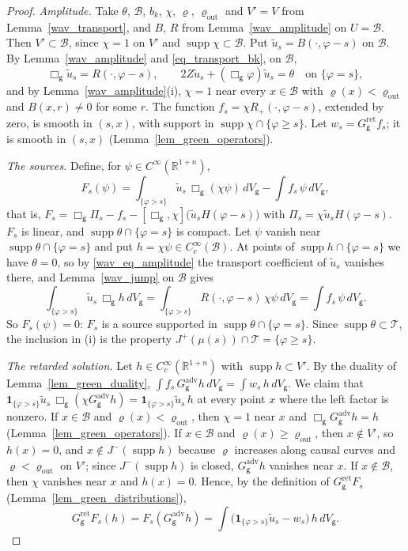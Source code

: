 \documentclass[11pt,a4paper,reqno]{amsart}
\theoremstyle{definition}
\numberwithin{equation}{section}
\newcommand{\R}{\mathbb{R}}
\newcommand{\cB}{\mathcal{B}}
\newcommand{\cT}{\mathcal{T}}
\newcommand{\sg}{\mathsf{g}}
\newcommand{\supp}{\operatorname{supp}}
\newcommand{\ret}{\mathrm{ret}}
\newcommand{\adv}{\mathrm{adv}}
\begin{document}
\begin{proof}
\emph{Amplitude.} Take $\theta$, $\cB$, $b_k$, $\chi$, $\varrho$, $\varrho_{\mathrm{out}}$ and $V'=V$ from
Lemma~\ref{wav_transport}, and $B$, $R$ from Lemma~\ref{wav_amplitude} on $U=\cB$. Then $V'\subset\cB$, since $\chi=1$ on
$V'$ and $\supp\chi\subset\cB$. Put $\tilde u_s=B(\cdot,\varphi-s)$ on $\cB$. By Lemma~\ref{wav_amplitude} and
\eqref{eq_transport_bk}, on $\cB$,
\begin{equation}\label{wav_eq_amplitude}
\Box_\sg\tilde u_s=R(\cdot,\varphi-s),\qquad 2Z\tilde u_s+(\Box_\sg\varphi)\tilde u_s=\theta\quad\text{on }\{\varphi=s\},
\end{equation}
and by Lemma~\ref{wav_amplitude}(i), $\chi=1$ near every $x\in\cB$ with $\varrho(x)<\varrho_{\mathrm{out}}$ and
$B(x,r)\ne0$ for some $r$. The function $f_s=\chi R_+(\cdot,\varphi-s)$, extended by zero, is smooth in $(s,x)$, with support
in $\supp\chi\cap\{\varphi\ge s\}$. Let $w_s=G^\ret_\sg f_s$; it is smooth in $(s,x)$ (Lemma~\ref{lem_green_operators}).

\emph{The sources.} Define, for $\psi\in C^\infty(\R^{1+n})$,
\[
F_s(\psi)=\int_{\{\varphi>s\}}\tilde u_s\,\Box_\sg(\chi\psi)\,dV_\sg-\int f_s\,\psi\,dV_\sg ,
\]
that is, $F_s=\Box_\sg\Pi_s-f_s-[\Box_\sg,\chi]\bigl(\tilde u_sH(\varphi-s)\bigr)$ with $\Pi_s=\chi\tilde u_sH(\varphi-s)$.
$F_s$ is linear, and $\supp\theta\cap\{\varphi=s\}$ is compact. Let $\psi$ vanish near $\supp\theta\cap\{\varphi=s\}$ and put
$h=\chi\psi\in C_c^\infty(\cB)$. At points of $\supp h\cap\{\varphi=s\}$ we have $\theta=0$, so by
\eqref{wav_eq_amplitude} the transport coefficient of $\tilde u_s$ vanishes there, and Lemma~\ref{wav_jump} on $\cB$ gives
\[
\int_{\{\varphi>s\}}\tilde u_s\,\Box_\sg h\,dV_\sg=\int_{\{\varphi>s\}}R(\cdot,\varphi-s)\,\chi\psi\,dV_\sg=\int f_s\,\psi\,dV_\sg .
\]
So $F_s(\psi)=0$: $F_s$ is a source supported in $\supp\theta\cap\{\varphi=s\}$. Since $\supp\theta\subset\cT$, the inclusion in
(i) is the property $J^+(\mu(s))\cap\cT=\{\varphi\ge s\}$.

\emph{The retarded solution.} Let $h\in C_c^\infty(\R^{1+n})$ with $\supp h\subset V'$. By the duality of
Lemma~\ref{lem_green_duality}, $\int f_s\,G^\adv_\sg h\,dV_\sg=\int w_s\,h\,dV_\sg$. We claim that
$\mathbf 1_{\{\varphi>s\}}\tilde u_s\,\Box_\sg(\chi G^\adv_\sg h)=\mathbf 1_{\{\varphi>s\}}\tilde u_s\,h$ at every point $x$
where the left factor is nonzero. If $x\in\cB$ and $\varrho(x)<\varrho_{\mathrm{out}}$, then $\chi=1$ near $x$ and
$\Box_\sg G^\adv_\sg h=h$ (Lemma~\ref{lem_green_operators}). If $x\in\cB$ and $\varrho(x)\ge\varrho_{\mathrm{out}}$, then $x\notin V'$, so $h(x)=0$, and
$x\notin J^-(\supp h)$ because $\varrho$ increases along causal curves and $\varrho<\varrho_{\mathrm{out}}$ on $V'$; since
$J^-(\supp h)$ is closed, $G^\adv_\sg h$ vanishes near $x$. If $x\notin\cB$, then $\chi$ vanishes near $x$ and $h(x)=0$.
Hence, by the definition of $G^\ret_\sg F_s$ (Lemma~\ref{lem_green_distributions}),
\begin{equation}\label{eq_usplit}
G^\ret_\sg F_s(h)=F_s(G^\adv_\sg h)=\int\bigl(\mathbf 1_{\{\varphi>s\}}\tilde u_s-w_s\bigr)\,h\,dV_\sg .
\end{equation}


\end{proof}
\end{document}
